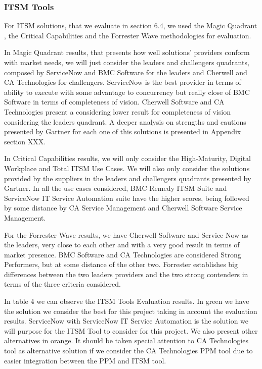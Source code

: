 \subsubsection{ITSM Tools}

For ITSM solutions, that we evaluate in section 6.4, we used the Magic Quadrant , the Critical Capabilities and the Forrester Wave methodologies for evaluation.\par
In Magic Quadrant results, that presents how well solutions' providers conform with market needs, we will just consider the leaders and challengers quadrants, composed by ServiceNow and BMC Software for the leaders and Cherwell and CA Technologies for challengers. ServiceNow is the best provider in terms of ability to execute with some advantage to concurrency but really close of BMC Software in terms of completeness of vision. Cherwell Software and CA Technologies present a considering lower result for completeness of vision considering the leaders quadrant. A deeper analysis on strengths and cautions presented by Gartner for each one of this solutions is presented in Appendix section XXX.\par
In Critical Capabilities results, we will only consider the High-Maturity, Digital Workplace and Total ITSM Use Cases. We will also only consider the solutions provided by the suppliers in the leaders and challengers quadrants presented by Gartner. In all the use cases considered, BMC Remedy ITSM Suite and ServiceNow IT Service Automation suite have the higher scores, being followed by some distance by CA Service Management and Cherwell Software Service Management.\par
For the Forrester Wave results, we have Cherwell Software and Service Now as the leaders, very close to each other and with a very good result in terms of market presence. BMC Software and CA Technologies are considered Strong Performers, but at some distance of the other two. Forrester establishes big differences between the two leaders providers and the two strong contenders in terms of the three criteria considered.\par
In table 4 we can observe the ITSM Tools Evaluation results. In green we have the solution we consider the best for this project taking in account the evaluation results. ServiceNow with ServiceNow IT Service Automation is the solution we will purpose for the ITSM Tool to consider for this project. We also present other alternatives in orange. It should be taken special attention to CA Technologies tool as alternative solution if we consider the CA Technologies PPM tool due to easier integration between the PPM and ITSM tool.


